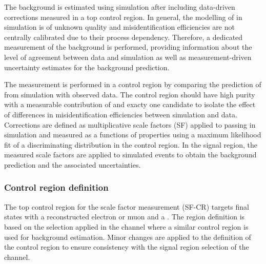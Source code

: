 The \ttbarFakes background is estimated using simulation after
including data-driven corrections measured in a top control region. In
general, the modelling of \faketauhadvis in simulation is of unknown
quality and \jettotauhadvis misidentification efficiencies are not
centrally calibrated due to their process dependency. Therefore, a
dedicated measurement of the \ttbarFakes background is performed,
providing information about the level of agreement between data and
simulation as well as measurement-driven uncertainty estimates for the
background prediction.

The measurement is performed in a control region by comparing the
prediction of \ttbarFakes from simulation with observed data. The
control region should have high \ttbar purity with a measurable
contribution of \ttbarFakes and exacty one \tauhadvis candidate to
isolate the effect of differences in misidentification efficiencies
between simulation and data. Corrections are defined as multiplicative
scale factors (SF) applied to \faketauhadvis passing \tauid in
simulation and measured as a functions of \faketauhadvis properties
using a maximum likelihood fit of a discriminating distribution in the
control region.  In the \hadhad signal region, the measured scale
factors are applied to simulated \ttbarFakes events to obtain the
background prediction and the associated uncertainties.


\subsubsection{Control region definition}

The top control region for the scale factor measurement (SF-CR)
targets final states with a reconstructed electron or muon and a
\tauhadvis. The region definition is based on the selection applied in
the \lephad channel where a similar control region is used for
\faketauhadvis background estimation. Minor changes are applied to the
definition of the control region to ensure consistency with the signal
region selection of the \hadhad channel.

